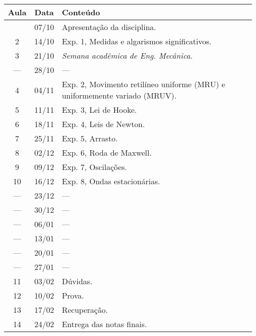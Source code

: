 \begin{center}
\begin{longtable}{ccp{70mm}}
\toprule
Aula & Data & Conteúdo \\
\midrule
\endhead
\bottomrule
\endfoot
  1 & 07/10 & Apresentação da disciplina. \\
  2 & 14/10 & Exp. 1, Medidas e algarismos significativos. \\
  3 & 21/10 & \emph{Semana acadêmica de Eng. Mecânica.}  \\
--- & 28/10 & --- \\
  4 & 04/11 & Exp. 2, Movimento retilíneo uniforme (MRU) e uniformemente variado (MRUV). \\
  5 & 11/11 & Exp. 3, Lei de Hooke. \\
  6 & 18/11 & Exp. 4, Leis de Newton. \\
  7 & 25/11 & Exp. 5, Arrasto. \\
  8 & 02/12 & Exp. 6, Roda de Maxwell. \\
  9 & 09/12 & Exp. 7, Oscilações. \\
 10 & 16/12 & Exp. 8, Ondas estacionárias. \\
--- & 23/12 & --- \\
--- & 30/12 & --- \\
--- & 06/01 & --- \\
--- & 13/01 & --- \\
--- & 20/01 & --- \\ 
--- & 27/01 & --- \\
 11 & 03/02 & Dúvidas. \\
 12 & 10/02 & Prova.\\
 13 & 17/02 & Recuperação.\\
 14 & 24/02 & Entrega das notas finais.
\end{longtable}
\end{center}

\clearpage

